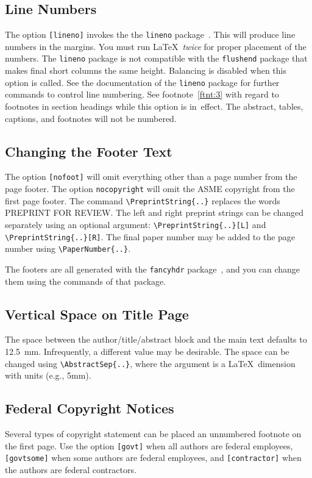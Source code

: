\documentclass[subscriptcorrection,upint,varvw,barcolor=Goldenrod3,mathalfa=cal=euler,balance,hyphenate,french,pdf-a]{asmejour} %
\begin{document}
\subsection{Line Numbers} The option \texttt{[lineno]} invokes the the \texttt{lineno} package~\cite{bottcher}.  This will produce line numbers in the margins. You must run \LaTeX\ \textit{twice} for proper placement of the numbers. The \texttt{lineno} package is not compatible with the \texttt{flushend} package that makes final short columns the same height. Balancing is disabled when this option is called. See the documentation of the \texttt{lineno} package for further commands to control line numbering. See footnote~\ref{ftnt:3} with regard to footnotes in section headings while this option is in~effect. The abstract, tables, captions, and footnotes will not be numbered.

\subsection{Changing the Footer Text}\label{sec:footer} The option \texttt{[nofoot]} will omit everything other than a page number from the page footer.  The option \texttt{nocopyright} will omit the ASME copyright from the first page footer. The command \verb|\PreprintString{..}| replaces the words \textsf{PREPRINT FOR REVIEW}. The left and right preprint strings can be changed separately using an optional argument: \verb|\PreprintString{..}[L]| and \verb|\PreprintString{..}[R]|.
The final paper number may be added to the page number using \verb|\PaperNumber{..}|.

The footers are all generated with the \texttt{fancyhdr} package~\cite{oostrum}, and you can change them using the commands of that package. 

\subsection{Vertical Space on Title Page} The space between the author/title/abstract block and the main text defaults to 12.5~mm. Infrequently, a different value may be desirable.  The space can be changed using \verb|\AbstractSep{..}|, where the argument is a \LaTeX\ dimension with units (e.g., 5mm).

\subsection{Federal Copyright Notices} Several types of copyright statement can be placed an unnumbered footnote on the first page. Use the option \texttt{[govt]} when all authors are federal employees, \texttt{[govtsome]} when some authors are federal employees, and \texttt{[contractor]} when the authors are federal contractors.
\end{document}
